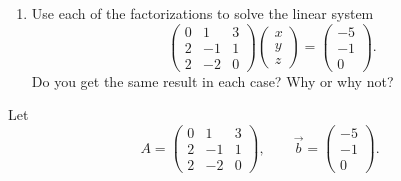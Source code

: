 \documentclass[10pt]{extarticle}
\begin{document}
\begin{problem}[Problem 3]
\begin{enumerate}[label=(\alph*)]
\begin{align*}
&=
\begin{pmatrix}
1 & 0 & 0\\
1 & 1 & 0\\
0 & 1 & 1
\end{pmatrix}
\begin{pmatrix}
2 & -2 & 0\\
0 & 1 & 1\\
0 & 0 & 2
\end{pmatrix}\\
\begin{pmatrix}
0 & 0 & 1\\
1 & 0 & 0\\
0 & 1 & 0
\end{pmatrix}
\begin{pmatrix}
0 & 1 & 3\\
2 & -1 & 1\\
2 & -2 & 0
\end{pmatrix}
&=
\begin{pmatrix}
1 & 0 & 0\\
0 & 1 & 0\\
1 & 1 & 1
\end{pmatrix}
\begin{pmatrix}
2 & -2 & 0\\
0 & 1 & 3\\
0 & 0 & -2
\end{pmatrix}
\end{align*}
\item Use each of the factorizations to solve the linear system
\[
\begin{pmatrix}
0 & 1 & 3\\
2 & -1 & 1\\
2 & -2 & 0
\end{pmatrix}
\begin{pmatrix}
x\\
y\\
z
\end{pmatrix}
=
\begin{pmatrix}
-5\\
-1\\
0
\end{pmatrix}.
\]
Do you get the same result in each case? Why or why not?
\end{enumerate}
\end{problem}

Let
\[
A=
\begin{pmatrix}
0 & 1 & 3\\
2 & -1 & 1\\
2 & -2 & 0
\end{pmatrix},
\qquad
\vec{b}=
\begin{pmatrix}
-5\\
-1\\
0
\end{pmatrix}.
\]
\end{document}
